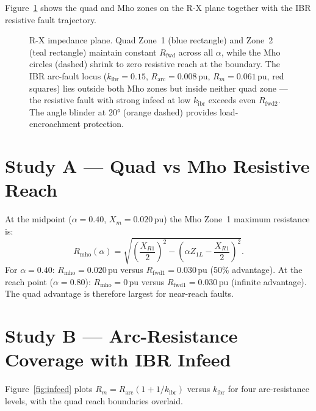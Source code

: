 \documentclass[11pt,a4paper]{article}
\begin{document}
Figure~\ref{fig:rxplane} shows the quad and Mho zones on the R-X plane together
with the IBR resistive fault trajectory.

\begin{figure}[htbp]
  \centering
  \resizebox{0.85\textwidth}{!}{%
  }
  \caption{R-X impedance plane.  Quad Zone~1 (blue rectangle) and Zone~2
           (teal rectangle) maintain constant $R_\mathrm{fwd}$ across all
           $\alpha$, while the Mho circles (dashed) shrink to zero resistive
           reach at the boundary.  The IBR arc-fault locus
           ($k_\mathrm{ibr}=0.15$, $R_\mathrm{arc}=0.008$\,pu,
           $R_m=0.061$\,pu, red squares) lies outside both Mho zones but
           inside neither quad zone --- the resistive fault with strong infeed
           at low $k_\mathrm{ibr}$ exceeds even $R_\mathrm{fwd2}$.  The angle
           blinder at 20° (orange dashed) provides load-encroachment protection.}
  \label{fig:rxplane}
\end{figure}

\section{Study A --- Quad vs Mho Resistive Reach}
\label{sec:studyA}

At the midpoint ($\alpha=0.40$, $X_m=0.020$\,pu) the Mho Zone~1 maximum
resistance is:
\begin{equation}
  R_\mathrm{mho}(\alpha) = \sqrt{\left(\frac{X_{R1}}{2}\right)^2
                           - \left(\alpha Z_{1L} - \frac{X_{R1}}{2}\right)^2}.
  \label{eq:mho_r}
\end{equation}
For $\alpha=0.40$: $R_\mathrm{mho}=0.020$\,pu versus $R_\mathrm{fwd1}=0.030$\,pu
(50\% advantage).  At the reach point ($\alpha=0.80$):
$R_\mathrm{mho}=0$\,pu versus $R_\mathrm{fwd1}=0.030$\,pu (infinite advantage).
The quad advantage is therefore largest for near-reach faults.

\section{Study B --- Arc-Resistance Coverage with IBR Infeed}
\label{sec:studyB}

Figure~\ref{fig:infeed} plots $R_m = R_\mathrm{arc}(1+1/k_\mathrm{ibr})$ versus
$k_\mathrm{ibr}$ for four arc-resistance levels, with the quad reach boundaries
overlaid.
\end{document}
